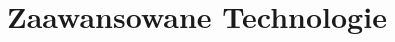 \documentclass[11pt,a4paper]{article}
\begin{document}
% 
% 

\newpage

\section{Zaawansowane Technologie}
\end{document}
